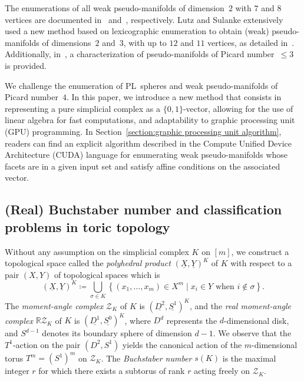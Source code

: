 \documentclass[11pt]{amsart}
\theoremstyle{plain}
\numberwithin{equation}{section}
\theoremstyle{definition}
\newcommand{\cZ}{\mathcal{Z}}
\newcommand{\R}{\mathbb{R}}
\begin{document}
The enumerations of all weak pseudo-manifolds of dimension~$2$ with $7$ and $8$ vertices are documented in~\cite{Datta_1999} and~\cite{Datta_Nilakantan_2002}, respectively.
Lutz and Sulanke extensively used a new method based on lexicographic enumeration to obtain (weak) pseudo-manifolds of dimensions~$2$ and~$3$, with up to $12$ and $11$ vertices, as detailed in~\cite{Lutz2008,Lutz2009}.
Additionally, in~\cite{Bagchi_Datta_1998}, a characterization of pseudo-manifolds of Picard number~$\leq 3$ is provided.

We challenge the enumeration of PL~spheres and weak pseudo-manifolds of Picard number~$4$.
In this paper, we introduce a new method that consists in representing a pure simplicial complex as a $\{0,1\}$-vector, allowing for the use of linear algebra for fast computations, and adaptability to graphic processing unit (GPU) programming.
In Section~\ref{section:graphic processing unit algorithm}, readers can find an explicit algorithm described in the Compute Unified Device Architecture (CUDA) language for enumerating weak pseudo-manifolds whose facets are in a given input set and satisfy affine conditions on the associated vector.



\subsection*{(Real) Buchstaber number and classification problems in toric topology}
Without any assumption on the simplicial complex $K$ on $[m]$, we construct a topological space called the \emph{polyhedral product} $ (\underline{X}, \underline{Y})^K $ of $K$ with respect to a pair $(X, Y)$ of topological spaces which is
$$
(\underline{X}, \underline{Y})^K \coloneqq \bigcup_{\sigma \in K} \left\{ (x_1, \ldots, x_m) \in X^m \mid x_i \in Y \text{ when } i \notin \sigma \right\}.
$$
The \emph{moment-angle complex} $\cZ_K$ of $K$ is $(\underline{D^2}, \underline{S^1})^K$, and the \emph{real moment-angle complex} $\R\cZ_K$ of $K$ is $(\underline{D^1}, \underline{S^0})^K$, where $D^d$ represents the $d$-dimensional disk, and $S^{d-1}$ denotes its boundary sphere of dimension $d-1$.
We observe that the $T^1$-action on the pair $(D^2, S^1)$ yields the canonical action of the $m$-dimensional torus $T^m = (S^1)^m$ on $\cZ_K$.
The \emph{Buchstaber number} $s(K)$ is the maximal integer $r$ for which there exists a subtorus of rank $r$ acting freely on $\cZ_K$.
\end{document}

